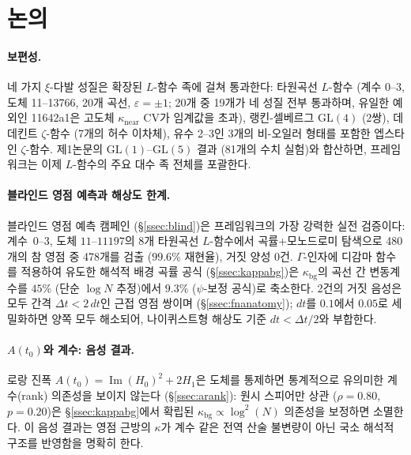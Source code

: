 \documentclass[11pt, a4paper]{article}
\theoremstyle{plain}
\theoremstyle{definition}
\begin{document}
\section{논의}
\label{sec:disc}

\paragraph{보편성.}
네 가지 $\xi$-다발 성질은 확장된 $L$-함수 족에 걸쳐 통과한다:
타원곡선 $L$-함수 (계수 0--3, 도체 11--13766, 20개 곡선,
$\varepsilon=\pm 1$; 20개 중 19개가 네 성질 전부 통과하며,
유일한 예외인 11642a1은 고도체 $\kappa_{\mathrm{near}}$ CV가
임계값을 초과), 랭킨-셀베르그 $\mathrm{GL}(4)$ (2쌍),
데데킨트 $\zeta$-함수 (7개의 허수 이차체),
유수 2--3인 3개의 비-오일러 형태를 포함한 엡스타인 $\zeta$-함수.
제1논문의 $\mathrm{GL}(1)$--$\mathrm{GL}(5)$ 결과 (81개의 수치 실험)와 합산하면,
프레임워크는 이제 $L$-함수의 주요 대수 족 전체를 포괄한다.

\paragraph{블라인드 영점 예측과 해상도 한계.}
블라인드 영점 예측 캠페인 (\S\ref{ssec:blind})은 프레임워크의
가장 강력한 실전 검증이다: 계수~0--3, 도체 $11$--$11197$의
8개 타원곡선 $L$-함수에서 곡률+모노드로미 탐색으로
480개의 참 영점 중 478개를 검출 ($99.6\%$ 재현율),
거짓 양성 0건.  $\Gamma$-인자에 디감마 함수를 적용하여 유도한
해석적 배경 곡률 공식 (\S\ref{ssec:kappabg})은
$\kappa_{\mathrm{bg}}$의 곡선 간 변동계수를
$45\%$ (단순 $\log N$ 추정)에서 $9.3\%$ ($\psi$-보정 공식)로 축소한다.
2건의 거짓 음성은 모두 간격 $\Delta t < 2\,dt$인 근접 영점 쌍이며
(\S\ref{ssec:fnanatomy}); $dt$를 $0.1$에서 $0.05$로 세밀화하면
양쪽 모두 해소되어, 나이퀴스트형 해상도 기준 $dt < \Delta t/2$와
부합한다.

\paragraph{$A(t_0)$와 계수: 음성 결과.}
로랑 진폭 $A(t_0) = \operatorname{Im}(H_0)^2 + 2H_1$은
도체를 통제하면 통계적으로 유의미한 계수(rank) 의존성을 보이지 않는다
(\S\ref{ssec:arank}): 원시 스피어만 상관 ($\rho=0.80$, $p=0.20$)은
\S\ref{ssec:kappabg}에서 확립된
$\kappa_{\mathrm{bg}} \propto \log^{2}(N)$ 의존성을 보정하면 소멸한다.
이 음성 결과는 영점 근방의 $\kappa$가 계수 같은 전역 산술 불변량이 아닌
국소 해석적 구조를 반영함을 명확히 한다.
\end{document}
